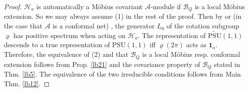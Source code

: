 \documentclass[12pt,a4paper,notitlepage]{article}
\theoremstyle{definition}
\theoremstyle{plain}
\newcommand{\mc}{\mathcal}
\newcommand{\id}{\mathbf{1}}
\newcommand{\PSU}{\mathrm{PSU}(1,1)}
\newcommand{\UPSU}{\widetilde{\mathrm{PSU}}(1,1)}
\numberwithin{equation}{section}
\begin{document}
\begin{proof}

	
$\mc H_a$ is automatically a M\"obius  covariant $\mc A$-module if $\mc B_Q$ is a local M\"obius extension. So we may always assume (1) in the rest of  the proof. Then by \cite[Cor. 4.4]{BCL98} or (in the case that $\mc A$ is a conformal net) \cite{Wei06}, the generator $L_0$ of the rotation subgroup $\varrho$ has positive spectrum when acting on $\mc H_a$. The representation of $\UPSU$ descends to a true representation of $\PSU$ iff $\varrho(2\pi)$ acts as $\id_a$. Therefore, the equivalence of (2) and that $\mc B_Q$ is a local M\"obius resp. conformal extension follows from Prop. \ref{lb21}  and the covariance property of $\mc B_Q$ stated in Thm. \ref{lb5}. The equivalence of the two irreducible conditions follows from Main Thm. \ref{lb12}.
\end{proof}
\end{document}
